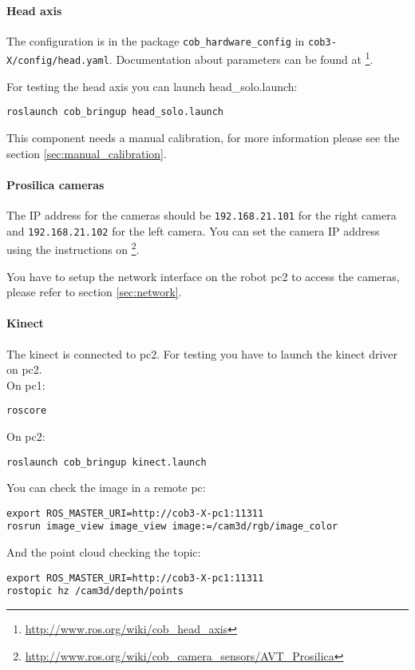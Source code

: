 \paragraph{Head axis}
The configuration is in the package \texttt{cob\_hardware\_config} in \texttt{cob3-X/config/head.yaml}. Documentation about parameters can be found at \footnote{\url{http://www.ros.org/wiki/cob_head_axis}}.

For testing the head axis you can launch head\_solo.launch:
\begin{lstlisting}
roslaunch cob_bringup head_solo.launch
\end{lstlisting}

This component needs a manual calibration, for more information please see the section \ref{sec:manual_calibration}.

\paragraph{Prosilica cameras}
The IP address for the cameras should be \texttt{192.168.21.101} for the right camera and \texttt{192.168.21.102} for the left camera. You can set the camera IP address using the instructions on \footnote{\url{http://www.ros.org/wiki/cob_camera_sensors/AVT_Prosilica}}.

You have to setup the network interface on the robot pc2 to access the cameras, please refer to section \ref{sec:network}.

\paragraph{Kinect}
The kinect is connected to pc2. 
For testing you have to launch the kinect driver on pc2.
\\On pc1:
\begin{lstlisting}
roscore
\end{lstlisting}
On pc2:
\begin{lstlisting}
roslaunch cob_bringup kinect.launch
\end{lstlisting}

You can check the image in a remote pc:
\begin{lstlisting}
export ROS_MASTER_URI=http://cob3-X-pc1:11311
rosrun image_view image_view image:=/cam3d/rgb/image_color
\end{lstlisting}

And the point cloud checking the topic:
\begin{lstlisting}
export ROS_MASTER_URI=http://cob3-X-pc1:11311
rostopic hz /cam3d/depth/points
\end{lstlisting}

